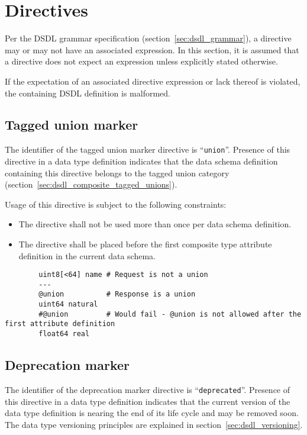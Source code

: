 \section{Directives}\label{sec:dsdl_directives}

Per the DSDL grammar specification (section~\ref{sec:dsdl_grammar}),
a directive may or may not have an associated expression.
In this section, it is assumed that a directive does not expect an expression unless explicitly stated otherwise.

If the expectation of an associated directive expression or lack thereof is violated,
the containing DSDL definition is malformed.

\subsection{Tagged union marker}

The identifier of the tagged union marker directive is ``\verb|union|''.
Presence of this directive in a data type definition indicates that the
data schema definition containing this directive belongs to the tagged union category
(section~\ref{sec:dsdl_composite_tagged_unions}).

Usage of this directive is subject to the following constraints:
\begin{itemize}
    \item The directive shall not be used more than once per data schema definition.
    \item The directive shall be placed before the first composite type attribute definition in the current data schema.
\end{itemize}

\begin{remark}
    \begin{verbatim}
        uint8[<64] name # Request is not a union
        ---
        @union          # Response is a union
        uint64 natural
        #@union         # Would fail - @union is not allowed after the first attribute definition
        float64 real
    \end{verbatim}
\end{remark}

\subsection{Deprecation marker}

The identifier of the deprecation marker directive is ``\verb|deprecated|''.
Presence of this directive in a data type definition indicates that the current version of the data type definition
is nearing the end of its life cycle and may be removed soon.
The data type versioning principles are explained in section~\ref{sec:dsdl_versioning}.

